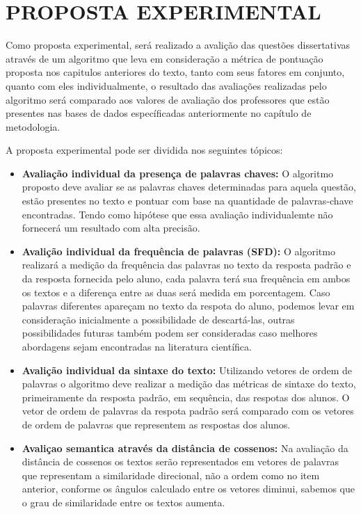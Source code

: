 \chapter{PROPOSTA EXPERIMENTAL}

Como proposta experimental, será realizado a avalição das questões dissertativas através de um algoritmo que leva em consideração a métrica de pontuação proposta nos capitulos anteriores do texto, tanto com seus fatores em conjunto, quanto com eles individualmente, o resultado das avaliações realizadas pelo algoritmo será comparado aos valores de avaliação dos professores que estão presentes nas bases de dados específicadas anteriormente no capítulo de metodologia.

A proposta experimental pode ser dividida nos seguintes tópicos:
\begin{itemize}
	\item \textbf{Avaliação individual da presença de palavras chaves:} O algoritmo proposto deve avaliar se as palavras chaves determinadas para aquela questão, estão presentes no texto e pontuar com base na quantidade de palavras-chave encontradas. Tendo como hipótese que essa avaliação individualemte não fornecerá um resultado com alta precisão.
	\item \textbf{Avalição individual da frequência de palavras (SFD):} O algoritmo realizará a medição da frequência das palavras no texto da resposta padrão e da resposta fornecida pelo aluno, cada palavra terá sua frequência em ambos os textos e a diferença entre as duas será medida em porcentagem. Caso palavras diferentes apareçam no texto da respota do aluno, podemos levar em consideração inicialmente a possibilidade de descartá-las, outras possibilidades futuras também podem ser consideradas caso melhores abordagens sejam encontradas na literatura científica.
	\item \textbf{Avalição individual da sintaxe do texto:} Utilizando vetores de ordem de palavras o algoritmo deve realizar a medição das métricas de sintaxe do texto, primeiramente da resposta padrão, em sequência, das respotas dos alunos. O vetor de ordem de palavras da respota padrão será comparado com os vetores de ordem de palavras que representem as respostas dos alunos.
	\item \textbf{Avaliçao semantica através da distância de cossenos:} Na avaliação da distância de cossenos  os textos serão representados em vetores de palavras que representam a similaridade direcional, não a ordem como no item anterior, conforme os ângulos calculado entre os vetores diminui, sabemos que o grau de similaridade entre os textos aumenta.
\end{itemize}

